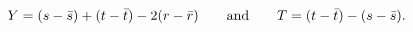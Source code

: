 \begin{equation}
Y=(s-\bar s) + (t - \bar t) -2(r-\bar r)\qquad\hbox{and}\qquad
T=(t-\bar t)-(s-\bar s).
\end{equation}

